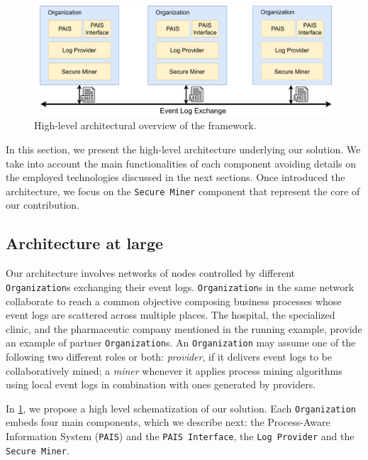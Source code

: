 \begin{figure}[t]
\centering
\includegraphics[width=13cm]{content/figures/architecture_diagram.pdf}
\caption{High-level architectural overview of the framework.}
\label{fig:architecture_diagram}
\end{figure}
In this section, we present the high-level architecture underlying our solution. We take into account the main functionalities of each component avoiding details on the employed technologies discussed in the next sections. Once introduced the architecture, we focus on the \texttt{Secure Miner} component that represent the core of our contribution.

\subsection{Architecture at large}
Our architecture involves networks of nodes controlled by different \texttt{Organization}s exchanging their event logs. \texttt{Organization}s in the same network collaborate to reach a common objective composing business processes whose event logs are scattered across multiple places. The hospital, the specialized clinic, and the pharmaceutic company mentioned in the running example, provide an example of partner \texttt{Organization}s. An \texttt{Organization} may assume one of the following two different roles or both: \textit{provider}, if it delivers event logs to be collaboratively mined; a \textit{miner} whenever it applies process mining algorithms using local event logs in combination with ones generated by providers. %

In \cref{fig:architecture_diagram}, we propose a high level schematization of our solution. Each \texttt{Organization} embeds four main components, which we describe next: the Process-Aware Information System (\texttt{PAIS}) and the \texttt{PAIS Interface}, the \texttt{Log Provider} and the \texttt{Secure Miner}.


